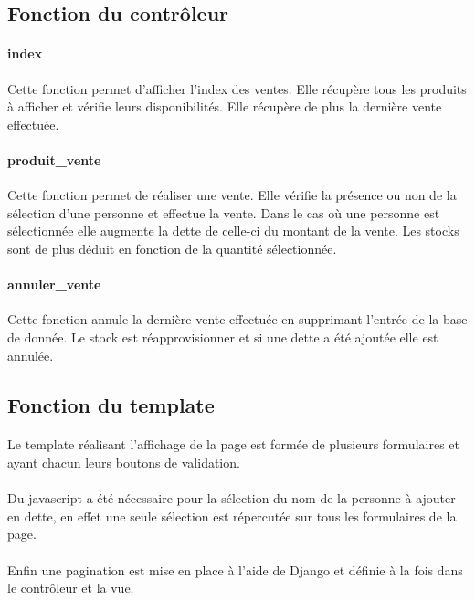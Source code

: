 \documentclass[twoside,UTF8]{EPURapport}
\begin{document}
        \subsection{Fonction du contrôleur}

            \paragraph{index}Cette fonction permet d'afficher l'index des ventes. Elle récupère tous les produits à afficher et vérifie leurs disponibilités. Elle récupère de plus la dernière vente effectuée.

            \paragraph{produit\_vente}Cette fonction permet de réaliser une vente. Elle vérifie la présence ou non de la sélection d'une personne et effectue la vente. Dans le cas où une personne est sélectionnée elle augmente la dette de celle-ci du montant de la vente. Les stocks sont de plus déduit en fonction de la quantité sélectionnée.
            \paragraph{annuler\_vente}Cette fonction annule la dernière vente effectuée en supprimant l'entrée de la base de donnée. Le stock est réapprovisionner et si une dette a été ajoutée elle est annulée.

        \subsection{Fonction du template}

            \paragraph{}Le template réalisant l'affichage de la page est formée de plusieurs formulaires et ayant chacun leurs boutons de validation.

            \paragraph{}Du javascript a été nécessaire pour la sélection du nom de la personne à ajouter en dette, en effet une seule sélection est répercutée sur tous les formulaires de la page.

            \paragraph{}Enfin une pagination est mise en place à l'aide de Django et définie à la fois dans le contrôleur et la vue.%
\end{document}
